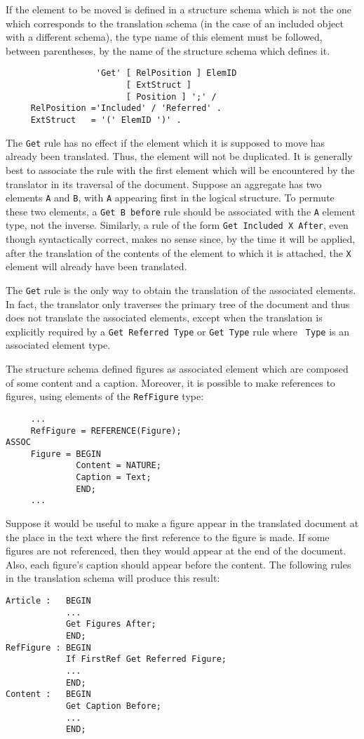 If the element to be moved is defined in a structure schema which is
not the one which corresponds to the translation schema (in the case
of an included object with a different schema), the type name of this
element must be followed, between parentheses, by the name of the
structure schema which defines it.

\begin{verbatim}
                  'Get' [ RelPosition ] ElemID 
                        [ ExtStruct ]
                        [ Position ] ';' /
     RelPosition ='Included' / 'Referred' .
     ExtStruct   = '(' ElemID ')' .
\end{verbatim}

The {\tt Get} rule has no effect if the element which it is supposed
to move has already been translated.  Thus, the element will not be
duplicated.  It is generally best to associate the rule with the first
element which will be encountered by the translator in its traversal
of the document.  Suppose an aggregate has two elements {\tt A} and
{\tt B}, with {\tt A} appearing first in the logical structure.  To
permute these two elements, a {\tt Get B before} rule should be
associated with the {\tt A} element type, not the inverse.  Similarly,
a rule of the form {\tt Get Included X After}, even though
syntactically correct, makes no sense since, by the time it will be
applied, after the translation of the contents of the element to which
it is attached, the {\tt X} element will already have been translated.

The {\tt Get} rule is the only way to obtain the translation of the
associated elements.  In fact, the translator only traverses the
primary tree of the document and thus does not translate the
associated elements, except when the translation is explicitly
required by a {\tt Get Referred Type} or {\tt Get Type} rule where {\tt
Type} is an associated element type.


\begin{example}
The structure schema defined figures as associated element which are
composed of some content and a caption.  Moreover, it is possible to make
references to figures, using elements of the {\tt RefFigure} type:
\begin{verbatim}
     ...
     RefFigure = REFERENCE(Figure);
ASSOC
     Figure = BEGIN
              Content = NATURE;
              Caption = Text;
              END;
     ...
\end{verbatim}
Suppose it would be useful to make a figure appear in the translated
document at the place in the text where the first reference to the
figure is made.  If some figures are not referenced, then they would
appear at the end of the document.  Also, each figure's caption should
appear before the content.  The following rules in the translation
schema will produce this result:
\begin{verbatim}
Article :   BEGIN
            ...
            Get Figures After;
            END;
RefFigure : BEGIN
            If FirstRef Get Referred Figure;
            ...
            END;
Content :   BEGIN
            Get Caption Before;
            ...
            END;
\end{verbatim}
\end{example}


